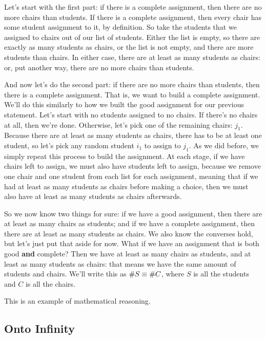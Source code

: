 Let's start with the first part: if there is a complete assignment, then there are no more chairs than students.
If there is a complete assignment, then every chair has some student assignment to it, by definition.
So take the students that we assigned to chairs out of our list of students.
Either the list is empty, so there are exactly as many students as chairs, or the list is not empty, and there are more students than chairs.
In either case, there are at least as many students as chairs: or, put another way, there are no more chairs than students.

And now let's do the second part: if there are no more chairs than students, then there is a complete assignment.
That is, we want to build a complete assignment.
We'll do this similarly to how we built the good assignment for our previous statement.
Let's start with no students assigned to no chairs.
If there's no chairs at all, then we're done.
Otherwise, let's pick one of the remaining chairs: $j_1$.
Because there are at least as many students as chairs, there has to be at least one student, so let's pick any random student $i_1$ to assign to $j_1$.
As we did before, we simply repeat this process to build the assignment.
At each stage, if we have chairs left to assign, we must also have students left to assign, because we remove one chair and one student from each list for each assignment, meaning that if we had at least as many students as chairs before making a choice, then we must also have at least as many students as chairs afterwards.

So we now know two things for sure: if we have a good assignment, then there are at least as many chairs as students; and if we have a complete assignment, then there are at least as many students as chairs.
We also know the converses  hold, but let's just put that aside for now.
What if we have an assignment that is both good \textbf{and} complete?
Then we have at least as many chairs as students, and at least as many students as chairs: that means we have the same amount of students and chairs.
We'll write this as $\# S \equiv \# C$, where $S$ is all the students and $C$ is all the chairs.

This is an example of mathematical reasoning.

\subsection{Onto Infinity}

